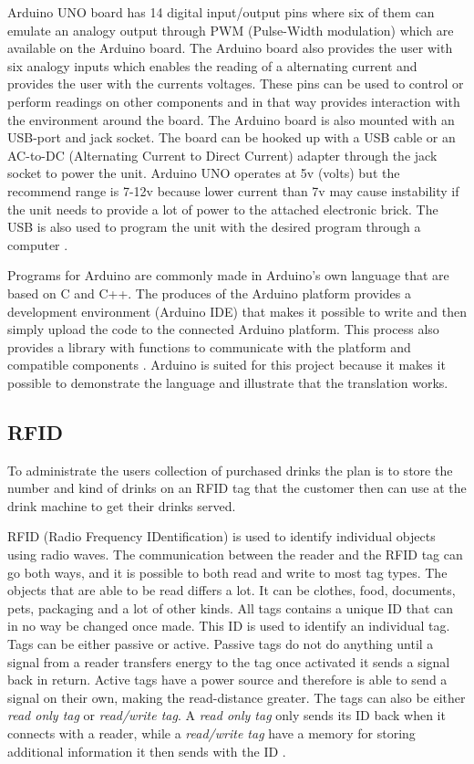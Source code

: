Arduino UNO board has 14 digital input/output pins where six of them can emulate an analogy output through PWM (Pulse-Width modulation) which are available on the Arduino board. The Arduino board also provides the user with six analogy inputs which enables the reading of a alternating current and provides the user with the currents voltages. These pins can be used to control or perform readings on other components and in that way provides interaction with the environment around the board.
The Arduino board is also mounted with an USB-port and jack socket. The board can be hooked up with a USB cable or an AC-to-DC (Alternating Current to Direct Current) adapter through the jack socket to power the unit. Arduino UNO operates at 5v (volts) but the recommend range is 7-12v because lower current than 7v may cause instability if the unit needs to provide a lot of power to the attached electronic brick. The USB is also used to program the unit with the desired program through a computer \citep{ArduinoUno}.

Programs for Arduino are commonly made in Arduino's own language that are based on C and C++. The produces of the Arduino platform provides a development environment (Arduino IDE) that makes it possible to write and then simply upload the code to the connected Arduino platform. This process also provides a library with functions to communicate with the platform and compatible components \citep{ArduinoLanguage}.
Arduino is suited for this project because it makes it possible to demonstrate the language and illustrate that the translation works.

\subsection{RFID}
To administrate the users collection of purchased drinks the plan is to store the number and kind of drinks on an RFID tag that the customer then can use at the drink machine to get their drinks served.

RFID (Radio Frequency IDentification) is used to identify individual objects using radio waves.
The communication between the reader and the RFID tag can go both ways, and it is possible to both read and write to most tag types. 
The objects that are able to be read differs a lot. It can be clothes, food, documents, pets, packaging and a lot of other kinds. 
All tags contains a unique ID that can in no way be changed once made. This ID is used to identify an individual tag.
Tags can be either passive or active. Passive tags do not do anything until a signal from a reader transfers energy to the tag once activated it sends a signal back in return. Active tags have a power source and therefore is able to send a signal on their own, making the read-distance greater.
The tags can also be either \textit{read only tag} or \textit{read/write tag}. A \textit{read only tag} only sends its ID back when it connects with a reader, while a \textit{read/write tag} have a memory for storing additional information it then sends with the ID \citep{RFID}.

